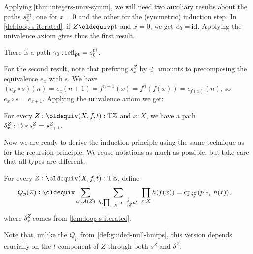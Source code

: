 \documentclass[a4paper,12pt]{amsart}
\begin{document}
Applying \cref{thm:integers-univ-symm}, we will need two auxiliary
results about the paths $s^{\mathord{\mathrm{pt}}}_x$, one for $x=0$ and
the other for the (symmetric) induction step.
In \cref{def:loop-s-iterated}, if $Z\jdeq\pt$ and $x=0$, we get $e_0 = \mathord{\mathrm{id}}$.
Applying the univalence axiom gives thus the first result.

\begin{lemma}\label{lem:s-pt-zero}
  There is a path $\gamma_0 : \mathop{{\mathrm{refl}}_{{\mathord{\mathrm{pt}}}}} = s^{\mathord{\mathrm{pt}}}_0$.
\end{lemma}

For the second result, note that prefixing $s^Z_x$ by ${{\circlearrowleft}}$
amounts to precomposing the equivalence $e_x$ with $s$.
We have $(e_x\circ s)(n) = e_x(n+1) = f^{n+1}(x) = f^n(f(x)) =e_{f(x)}(n)$,
so $e_x\circ s = e_{x+1}$. Applying the univalence axiom we get:

\begin{lemma}\label{lem:loop-s-iterated}
  For every $Z\defeq(X,f,t):\TorZ$ and $x:X$, we have a path
  ${\delta^Z_x}: {{\circlearrowleft}} * s^Z_x = s^Z_{x+1}$.
\end{lemma}

Now we are ready to derive the induction principle using the same
technique as for the recursion principle. We reuse notations as much as
possible, but take care that all types are different.

\begin{definition}\label{def:guided-null-hmtps-dep}
For every $Z\defeq(X,f,t):\TorZ$, define
\begin{align*}\label{eq:TBD}
Q_p(Z)&\defeq \sum_{a' : A(Z)}~\sum_{h : \prod_{x:X} a =^A_{s^Z_x} a'}~\prod_{x:X} h(f(x)) = \cp{\delta^Z_x}(p\cto h(x)),
\end{align*}
where $\delta^Z_x$ comes from \cref{lem:loop-s-iterated}.
\end{definition}
Note that, unlike the $Q_p$ from~\cref{def:guided-null-hmtps},
this version depends crucially on the $t$-component of $Z$ through
both $s^Z$ and $\delta^Z$.
\end{document}

